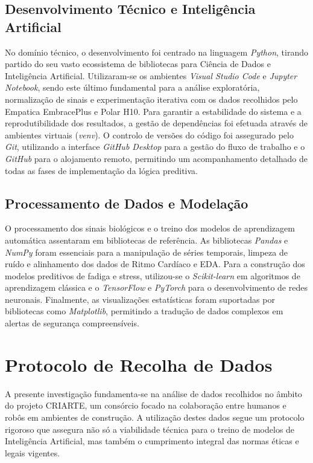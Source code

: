\subsection{Desenvolvimento Técnico e Inteligência Artificial}
No domínio técnico, o desenvolvimento foi centrado na linguagem \textit{Python}, tirando partido do seu vasto ecossistema de bibliotecas para Ciência de Dados e Inteligência Artificial. Utilizaram-se os ambientes \textit{Visual Studio Code} e \textit{Jupyter Notebook}, sendo este último fundamental para a análise exploratória, normalização de sinais e experimentação iterativa com os dados recolhidos pelo Empatica EmbracePlus e Polar H10. Para garantir a estabilidade do sistema e a reprodutibilidade dos resultados, a gestão de dependências foi efetuada através de ambientes virtuais (\textit{venv}). O controlo de versões do código foi assegurado pelo \textit{Git}, utilizando a interface \textit{GitHub Desktop} para a gestão do fluxo de trabalho e o \textit{GitHub} para o alojamento remoto, permitindo um acompanhamento detalhado de todas as fases de implementação da lógica preditiva.

\subsection{Processamento de Dados e Modelação}
O processamento dos sinais biológicos e o treino dos modelos de aprendizagem automática assentaram em bibliotecas de referência. As bibliotecas \textit{Pandas} e \textit{NumPy} foram essenciais para a manipulação de séries temporais, limpeza de ruído e alinhamento dos dados de Ritmo Cardíaco e EDA. Para a construção dos modelos preditivos de fadiga e stress, utilizou-se o \textit{Scikit-learn} em algoritmos de aprendizagem clássica e o \textit{TensorFlow} e \textit{PyTorch} para o desenvolvimento de redes neuronais. Finalmente, as visualizações estatísticas foram suportadas por bibliotecas como \textit{Matplotlib}, permitindo a tradução de dados complexos em alertas de segurança compreensíveis.

\section{Protocolo de Recolha de Dados}
\label{sec:protocolo}

A presente investigação fundamenta-se na análise de dados recolhidos no âmbito do projeto CRIARTE, um consórcio focado na colaboração entre humanos e robôs em ambientes de construção. A utilização destes dados segue um protocolo rigoroso que assegura não só a viabilidade técnica para o treino de modelos de Inteligência Artificial, mas também o cumprimento integral das normas éticas e legais vigentes.

